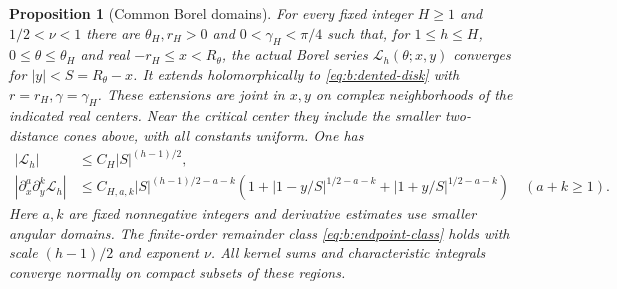 \documentclass[a4paper,10pt]{article}
\numberwithin{equation}{section}
\theoremstyle{paperplain}
\newtheorem{prp}[thm]{Proposition}
\theoremstyle{paperremark}
\theoremstyle{paperplain}
\begin{document}
\begin{prp}[Common Borel domains]\label{prp:b:common-domains}
For every fixed integer $H\geq1$ and $1/2<\nu<1$ there are
$\theta_H,r_H>0$ and $0<\gamma_H<\pi/4$ such that, for $1\leq h\leq H$,
$0\leq\theta\leq\theta_H$ and real
$-r_H\leq x<R_\theta$, the actual Borel series
$\mathcal L_h(\theta;x,y)$ converges for $|y|<S=R_\theta-x$.
It extends holomorphically to \eqref{eq:b:dented-disk} with
$r=r_H,\gamma=\gamma_H$. These extensions are joint
in $x,y$ on complex neighborhoods of the indicated real centers.
Near the critical center they include the smaller two-distance
cones above, with all constants uniform. One has
\begin{equation}\label{eq:b:common-bounds}
 \begin{aligned}
 |\mathcal L_h|&\leq C_H|S|^{(h-1)/2},\\
 |\partial_x^a\partial_y^k\mathcal L_h|
 &\leq C_{H,a,k}|S|^{(h-1)/2-a-k}
   \left(1+|1-y/S|^{1/2-a-k}
            +|1+y/S|^{1/2-a-k}\right)
                  \quad(a+k\geq1).
 \end{aligned}
\end{equation}
Here $a,k$ are fixed nonnegative integers and derivative estimates
use smaller angular domains. The finite-order remainder class
\eqref{eq:b:endpoint-class} holds with scale $(h-1)/2$ and exponent
$\nu$. All kernel sums and characteristic integrals converge
normally on compact subsets of these regions.
\end{prp}
\end{document}
